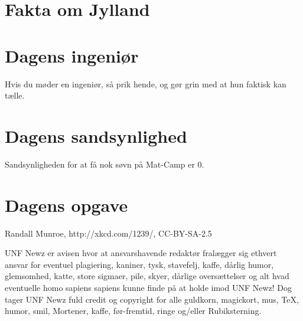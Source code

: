 \begin{minipage}[b]{0.95\linewidth}
\begin{minipage}[t]{0.47\textwidth}
\section*{Fakta om Jylland}

\section*{Dagens ingeniør}
Hvis du møder en ingeniør, så prik hende, og gør grin med at hun faktisk kan tælle.

\section*{Dagens sandsynlighed}
Sandsynligheden for at få nok søvn på Mat-Camp er $0$.

\section*{Dagens opgave}

\end{minipage}

\begin{center}
\tiny Randall Munroe, http://xkcd.com/1239/, CC-BY-SA-2.5

\tiny UNF Newz er avisen hvor at ansvarshavende redaktør fralægger sig ethvert ansvar for eventuel plagiering, kaniner, tysk, stavefelj, kaffe, dårlig humor, glemsomhed, katte, store sigmaer, pile, skyer, dårlige oversættelser og alt hvad eventuelle homo sapiens sapiens kunne finde på at holde imod UNF Newz! Dog tager UNF Newz fuld credit og copyright for alle guldkorn, magickort, mus, \TeX, humor, smil, Mortener, kaffe, før-fremtid, ringe og/eller Rubiksterning.
\end{center}
\end{minipage}

